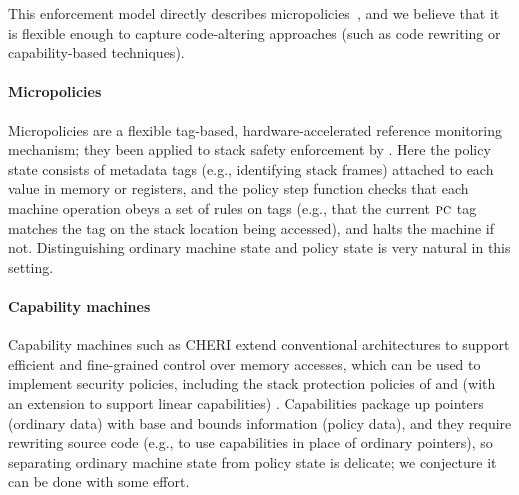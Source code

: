 \documentclass[acmsmall,review,anonymous]{acmart}\settopmatter{printfolios=true,printccs=false,printacmref=false}
\begin{document}

This enforcement model directly describes
micropolicies~\citep{pump_oakland2015}, and we believe that it is
flexible enough to capture code-altering approaches (such as code rewriting
or capability-based techniques).

\newcommand{\TAGS}{\mathcal{T}}
\newcommand{\tagname}{t}
\newcommand{\uP}{{\mu P}}

\paragraph*{Micropolicies}
%
Micropolicies are a flexible tag-based, hardware-accelerated
reference monitoring mechanism; they been applied to stack safety
enforcement by \citet{DBLP:conf/sp/RoesslerD18}.
Here the policy state consists of metadata tags (e.g., identifying stack frames)
attached to each value in memory or registers, and the policy step
function checks that each machine operation obeys a set of rules on tags
(e.g., that the current $\textsc{pc}$ tag matches the tag on the stack
location being accessed), and halts the machine if not.  Distinguishing
ordinary machine state and policy state is very natural in this setting.

\paragraph*{Capability machines}
%
Capability machines such as CHERI \citep{Woodruff+14} extend conventional
architectures to support efficient and fine-grained control over memory
accesses, which can be used to implement security policies, including
the stack protection policies of
\citet{Skorstengaard+19b} and (with an extension to support linear capabilities) \citet{Skorstengaard+19}.
Capabilities package up pointers
(ordinary data) with base and bounds information (policy data),
and they require rewriting source code (e.g., to use capabilities in place
of ordinary pointers), so separating ordinary machine state from policy
state is delicate; we conjecture it can be done with some effort.
\end{document}
